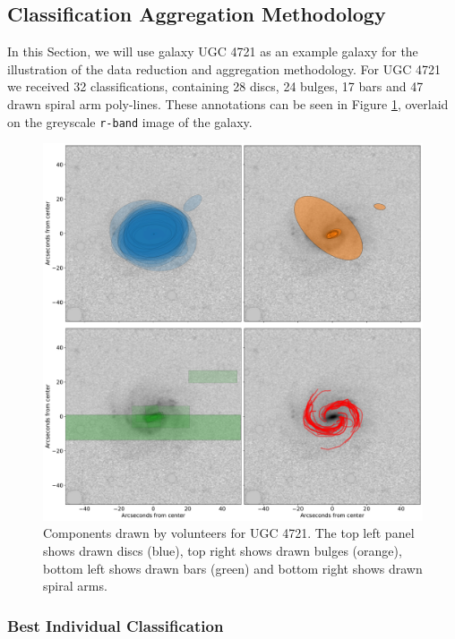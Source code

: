 \documentclass[../main.tex]{subfiles}
\begin{document}
\subsection{Classification Aggregation Methodology}

In this Section, we will use galaxy UGC 4721 as an example galaxy for the illustration of the data reduction and aggregation methodology. For UGC 4721 we received 32 classifications, containing 28 discs, 24 bulges, 17 bars and 47 drawn spiral arm poly-lines. These annotations can be seen in Figure \ref{fig:drawn_shapes}, overlaid on the greyscale \texttt{r-band} image of the galaxy.

\begin{figure}
  \includegraphics[width=17.3cm]{images__method/drawn_shapes.pdf}
  \caption{Components drawn by volunteers for UGC 4721. The top left panel shows drawn discs (blue), top right shows drawn bulges (orange), bottom left shows drawn bars (green) and bottom right shows drawn spiral arms.}
  \label{fig:drawn_shapes}
\end{figure}

\subsubsection{Best Individual Classification}
\end{document}
